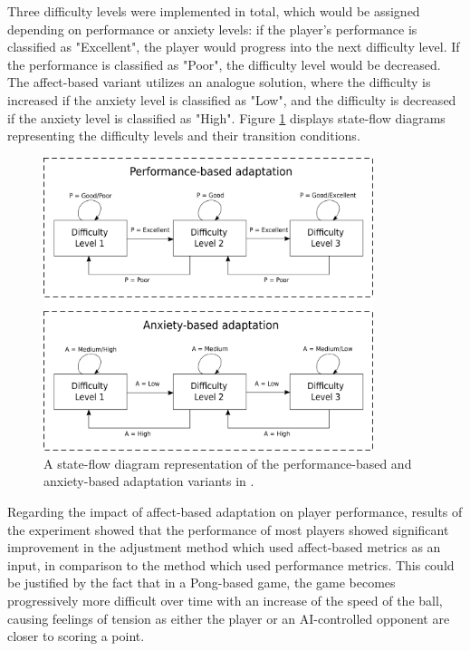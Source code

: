 Three difficulty levels were implemented in total, which would be assigned depending on performance or anxiety levels: if the player's performance is classified as "Excellent", the player would progress into the next difficulty level. If the performance is classified as "Poor", the difficulty level would be decreased. The affect-based variant utilizes an analogue solution, where the difficulty is increased if the anxiety level is classified as "Low", and the difficulty is decreased if the anxiety level is classified as "High". Figure \ref{fig:affective-adaptation} displays state-flow diagrams representing the difficulty levels and their transition conditions.

\begin{figure}[!h]
    \caption{A state-flow diagram representation of the performance-based and anxiety-based adaptation variants in \cite{article_affectivedda}.}
    \begin{center}
        \includegraphics[width=26em]{figures/fig-affective-adaptation.png}
    \end{center}
    \label{fig:affective-adaptation}
\end{figure}


Regarding the impact of affect-based adaptation on player performance, results of the experiment showed that the performance of most players showed significant improvement in the adjustment method which used affect-based metrics as an input, in comparison to the method which used performance metrics.  This could be justified by the fact that in a Pong-based game, the game becomes progressively more difficult over time with an increase of the speed of the ball, causing feelings of tension as either the player or an AI-controlled opponent are closer to scoring a point.

